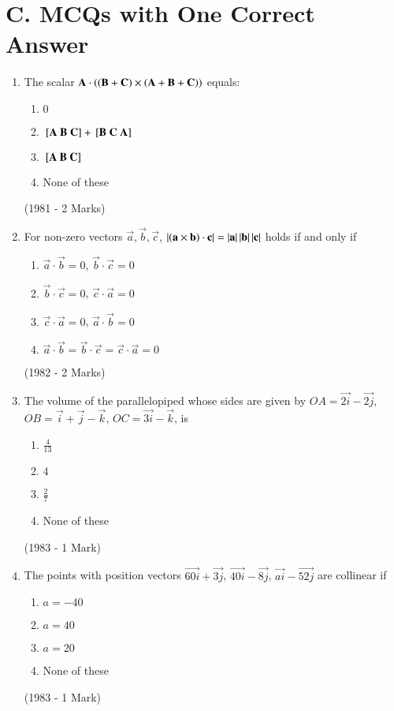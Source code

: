 \documentclass[journal]{IEEEtran}
\begin{document}
\section{C. MCQs with One Correct Answer}
\begin{enumerate}
\item The scalar $\mathbf{A}\cdot\left(\left(\mathbf{B}+\mathbf{C})\times(\mathbf{A}+\mathbf{B}+\mathbf{C}\right)\right)$ equals:
\begin{enumerate}
\item  $0$
\item ${}\left[\mathbf{A}\ \mathbf{B}\ \mathbf{C}\right] + {}\left[\mathbf{B}\ \mathbf{C}\ \mathbf{A}\right]$
\item $\sbrak{\vec{A}\ \vec{B}\ \vec{C}}$
\item None of these
\end{enumerate}
\hfill (1981 - 2 Marks)

\item For non-zero vectors $\vec{a}, \vec{b}, \vec{c}$, $\left\vert\left(\mathbf{a}\times\mathbf{b}\right)\cdot\mathbf{c}\right\vert = \left\vert\mathbf{a}\right\vert\left\vert\mathbf{b}\right\vert\left\vert\mathbf{c}\right\vert$ holds if and only if
\begin{enumerate}
\item $\vec{a}\cdot\vec{b}=0$, $\vec{b}\cdot\vec{c}=0$
\item $\vec{b}\cdot\vec{c}=0$, $\vec{c}\cdot\vec{a}=0$
\item $\vec{c}\cdot\vec{a}=0$, $\vec{a}\cdot\vec{b}=0$
\item $\vec{a}\cdot\vec{b}= \vec{b}\cdot\vec{c}= \vec{c}\cdot\vec{a}=0$
\end{enumerate}
\hfill (1982 - 2 Marks)

\item The volume of the parallelopiped whose sides are given by $OA =\vec{2i}-\vec{2j}$, $OB = \vec{i}+\vec{j}-\vec{k}$, $OC = \vec{3i}-\vec{k}$, is 
\begin{enumerate}
\item $\frac{4}{13}$
\item $4$
\item $\frac{2}{7}$
\item None of these
\end{enumerate}
\hfill (1983 - 1 Mark)

\item The points with position vectors $\vec{60i} + \vec{3j}$, $\vec{40i}-\vec{8j}$, $\vec{ai}-\vec{52j}$ are collinear if
\begin{enumerate}
\item $a=-40$
\item $a=40$
\item $a=20$
\item None of these
\end{enumerate}
\hfill (1983 - 1 Mark)


\end{enumerate}
\end{document}
